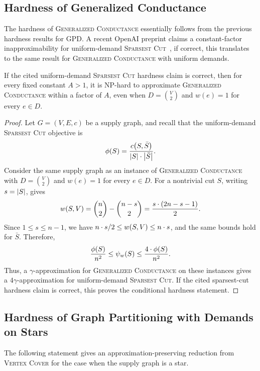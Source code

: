 \subsection{Hardness of Generalized Conductance}
The hardness of \textsc{Generalized Conductance} essentially follows from the previous hardness results for GPD. A recent OpenAI preprint claims a constant-factor inapproximability for uniform-demand \textsc{Sparsest Cut}~\cite{OAI:Constant-factor-hardness-of-uniform-sparsest-cut-September-24-2026}, if correct, this translates to the same result for \textsc{Generalized Conductance} with uniform demands.
\begin{corollary}\label{cor:generalized-conductance-hardness}
  If the cited uniform-demand \textsc{Sparsest Cut} hardness claim is correct, then for every fixed constant $A>1$, it is NP-hard to approximate \textsc{Generalized Conductance} within a factor of $A$, even when $D=\binom{V}{2}$ and $w(e)=1$ for every $e\in D$.
\end{corollary}
\begin{proof}
  Let $G=(V,E,c)$ be a supply graph, and recall that the uniform-demand \textsc{Sparsest Cut} objective is
  \[
\phi\mathopen{}\left( S \right)
=\frac{c\mathopen{}\left( S,\bar{S} \right)}{\mathopen{}\left| S \right|\cdot\mathopen{}\left| \bar{S} \right|}.
  \]
  Consider the same supply graph as an instance of \textsc{Generalized Conductance} with $D=\binom{V}{2}$ and $w(e)=1$ for every $e\in D$. For a nontrivial cut $S$, writing $s=\mathopen{}\left| S \right|$, gives
  \[
w\mathopen{}\left( S,V \right)=\binom{n}{2}-\binom{n-s}{2}
  =\frac{s\cdot(2n-s-1)}{2}.
  \]
  Since $1\leq s\leq n-1$, we have $n\cdot s/2\leq w\mathopen{}\left( S,V \right)\leq n\cdot s$,  and the same bounds hold for $\bar{S}$. Therefore,
  \[
\frac{\phi\mathopen{}\left( S \right)}{n^2}
\leq \psi_w\mathopen{}\left( S \right)
\leq \frac{4\cdot \phi\mathopen{}\left( S \right)}{n^2}.
  \]
  Thus, a $\gamma$-approximation for \textsc{Generalized Conductance} on these instances gives a $4\gamma$-approximation for uniform-demand \textsc{Sparsest Cut}. If the cited sparsest-cut hardness claim is correct, this proves the conditional hardness statement.
\end{proof}

\subsection{Hardness of Graph Partitioning with Demands on Stars}

The following statement gives an approximation-preserving reduction from \textsc{Vertex Cover} for the case when the supply graph is a star.

